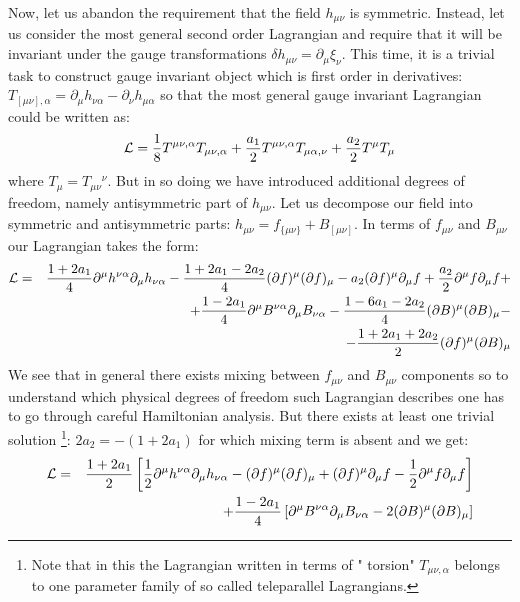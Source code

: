 \documentclass[a4paper,12pt]{article}
\begin{document}
Now, let us abandon the requirement that the field $h_{\mu\nu}$ is
symmetric. Instead, let us consider the most general second order
Lagrangian and require that it will be invariant under the gauge
transformations $\delta h_{\mu\nu} = \partial_\mu \xi_\nu$. This time,
it is a trivial task to construct gauge invariant object which is
first order in derivatives: $T_{[\mu\nu],\alpha} = \partial_\mu
h_{\nu\alpha} - \partial_\nu h_{\mu\alpha}$  so that the most general
gauge invariant Lagrangian could be written as:
\begin{equation}
{\cal L} = \frac{1}{8} T^{\mu\nu,\alpha} T_{\mu\nu,\alpha} +
\frac{a_1}{2} T^{\mu\nu,\alpha} T_{\mu\alpha,\nu} + \frac{a_2}{2}
T^\mu T_\mu
\end{equation}
where $T_\mu = T_{\mu\nu}{}^\nu$. But in so doing we have introduced
additional degrees of freedom, namely antisymmetric part of
$h_{\mu\nu}$. Let us decompose our field into symmetric and
antisymmetric parts: $h_{\mu\nu} = f_{\{\mu\nu\}} + B_{[\mu\nu]}$. In
terms of $f_{\mu\nu}$ and $B_{\mu\nu}$ our Lagrangian takes the form:
\begin{eqnarray}
{\cal L} &=& \frac{1+2 a_1}{4} \partial^\mu h^{\nu\alpha} \partial_\mu
h_{\nu\alpha} - \frac{1+2 a_1-2 a_2}{4} (\partial f)^\mu
(\partial f)_\mu - a_2 (\partial f)^\mu \partial_\mu f + \frac{a_2}{2}
\partial^\mu f \partial_\mu f + \nonumber \\
 && + \frac{1-2 a_1}{4} \partial^\mu B^{\nu\alpha} \partial_\mu
 B_{\nu\alpha} - \frac{1-6 a_1-2 a_2}{4} (\partial B)^\mu
 (\partial B)_\mu - \nonumber \\
&& - \frac{1+2 a_1+2 a_2}{2} (\partial f)^\mu  (\partial B)_\mu
\end{eqnarray}
We see that in general there exists mixing between $f_{\mu\nu}$ and
$B_{\mu\nu}$ components so to understand which physical degrees of
freedom such Lagrangian describes one has to go through careful
Hamiltonian analysis. But there exists at least one trivial solution
\footnote{Note that in this the Lagrangian written in terms of "
torsion" $T_{\mu\nu,\alpha}$ belongs to one parameter family of so
called teleparallel Lagrangians.}: $2 a_2 = -( 1 + 2 a_1)$ for
which mixing term is absent and we get:
\begin{eqnarray}
{\cal L} &=& \frac{1+2 a_1}{2} \left[ \frac{1}{2} \partial^\mu
h^{\nu\alpha} \partial_\mu h_{\nu\alpha} - (\partial f)^\mu
(\partial f)_\mu + (\partial f)^\mu \partial_\mu f - \frac{1}{2}
\partial^\mu f \partial_\mu f \right] \nonumber \\
 && + \frac{1-2 a_1}{4} \left[ \partial^\mu B^{\nu\alpha} \partial_\mu
 B_{\nu\alpha} - 2 (\partial B)^\mu  (\partial B)_\mu \right]
\end{eqnarray}
\end{document}
